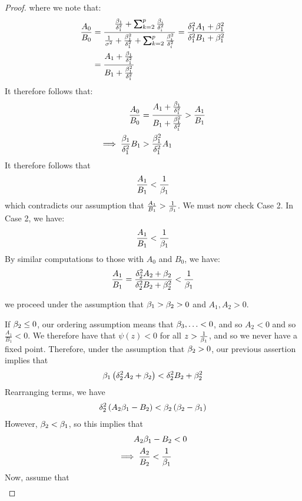 \documentclass[12pt,leqno,letterpaper]{article}
\begin{document}
\begin{proof}
where we note that:
\begin{align}
\frac{A_0}{B_0} &= \frac{\frac{\gb_1}{\gd_1^2}+\sum_{k=2}^p \frac{\gb_i}{\gd_i^2}}{\frac{1}{\gs^2}+ \frac{\gb_1^2}{\gd_1^2}+ \sum_{k=2}^p \frac{\gb_i^2}{\gd_i^2}} = \frac{\gd_1^2 A_1 + \gb_1^2}{\gd_1^2 B_1 + \gb_1^2}\\
&= \frac{A_1 + \frac{\gb_1}{\gd_1^2}}{B_1 + \frac{\gb_1^2}{\gd_1^2}}
\end{align}
It therefore follows that:
\begin{align}
\frac{A_0}{B_0} &= \frac{A_1 + \frac{\beta_1}{\delta_1^2}}{B_1 + \frac{\beta_1^2}{\delta_1^2}}> \frac{A_1}{B_1}\\
\implies \frac{\beta_1}{\delta_1^2}B_1 &> \frac{\beta_1^2}{\delta_1^2} A_1
\end{align}
It therefore follows that 
\begin{align}
\frac{A_1}{B_1}< \frac{1}{\beta_1}
\end{align}
which contradicts our assumption that $\frac{A_1}{B_1}> \frac{1}{\beta_1}$.  We must now check Case 2.
In Case 2, we have:
\begin{align}
\frac{A_1}{B_1} < \frac{1}{\beta_1}
\end{align}
By similar computations to those with $A_0$ and $B_0$, we have:
\begin{align}
\frac{A_1}{B_1} = \frac{\delta_2^2 A_2 + \beta_2}{\delta_2^2 B_2 + \beta_2^2} < \frac{1}{\beta_1}
\end{align}
\begin{assumption}
we proceed under the assumption that $\beta_1>\beta_2>0$ and $A_1, A_2>0$.  
\end{assumption}
If $\beta_2\leq 0$, our ordering assumption means that $\beta_3, \ldots <0$, and so $A_2<0$ and so $\frac{A_1}{B_1}<0$.  We therefore have that $\psi(z)<0$ for all $z>\frac{1}{\beta_1}$, and so we never have a fixed point.  Therefore, under the assumption that $\beta_2>0$, our previous assertion implies that
\begin{align}
\beta_1 \left(\delta_2^2 A_2 + \beta_2\right) < \delta_2^2 B_2 + \beta_2^2
\end{align}
Rearranging terms, we have
\begin{align}
\delta_2^2 \left(A_2 \beta_1 - B_2\right)<\beta_2\left(\beta_2-\beta_1\right)
\end{align}
However, $\beta_2<\beta_1$, so this implies that
\begin{align}
A_2 \beta_1- B_2 &<0\\
\implies \frac{A_2}{B_2}< \frac{1}{\beta_1}
\end{align}
Now, assume that
\begin{align}

\end{align}
\end{proof}
\end{document}
